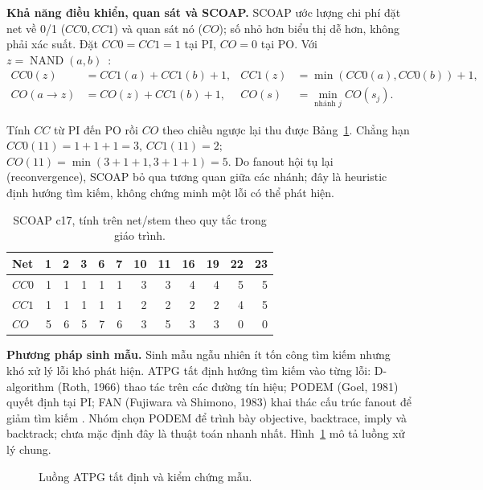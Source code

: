 \textbf{Khả năng điều khiển, quan sát và SCOAP.}
SCOAP ước lượng chi phí đặt net về 0/1 ($CC0,CC1$) và quan sát nó ($CO$);
số nhỏ hơn biểu thị dễ hơn, không phải xác suất. Đặt $CC0=CC1=1$ tại PI,
$CO=0$ tại PO. Với $z=\operatorname{NAND}(a,b)$~\cite[pp.~41--42]{p1_wang2006}:
\[
\begin{aligned}
CC0(z)&=CC1(a)+CC1(b)+1, & CC1(z)&=\min(CC0(a),CC0(b))+1,\\
CO(a\!\to\!z)&=CO(z)+CC1(b)+1, & CO(s)&=\min_{\text{nhánh }j}CO(s_j).
\end{aligned}
\]

Tính $CC$ từ PI đến PO rồi $CO$ theo chiều ngược lại thu được
Bảng~\ref{tab:p1-scoap}. Chẳng hạn $CC0(11)=1+1+1=3$,
$CC1(11)=2$; $CO(11)=\min(3+1+1,3+1+1)=5$.
Do fanout hội tụ lại (reconvergence), SCOAP bỏ qua tương quan giữa các nhánh;
đây là heuristic định hướng tìm kiếm, không chứng minh một lỗi có thể phát hiện.
\begin{table}[htbp]
\centering\small
\caption{SCOAP c17, tính trên net/stem theo quy tắc trong giáo trình.}
\label{tab:p1-scoap}
\begin{tabular}{@{}lrrrrrrrrrrr@{}}
\toprule
Net & 1 & 2 & 3 & 6 & 7 & 10 & 11 & 16 & 19 & 22 & 23\\
\midrule
$CC0$ & 1 & 1 & 1 & 1 & 1 & 3 & 3 & 4 & 4 & 5 & 5\\
$CC1$ & 1 & 1 & 1 & 1 & 1 & 2 & 2 & 2 & 2 & 4 & 5\\
$CO$  & 5 & 6 & 5 & 7 & 6 & 3 & 5 & 3 & 3 & 0 & 0\\
\bottomrule
\end{tabular}
\end{table}

\textbf{Phương pháp sinh mẫu.}
Sinh mẫu ngẫu nhiên ít tốn công tìm kiếm nhưng khó xử lý lỗi khó phát hiện.
ATPG tất định hướng tìm kiếm vào từng lỗi: D-algorithm (Roth, 1966) thao tác
trên các đường tín hiệu; PODEM (Goel, 1981) quyết định tại PI; FAN
(Fujiwara và Shimono, 1983) khai thác cấu trúc fanout để giảm tìm kiếm
\cite[Ch.~4]{p1_wang2006}. Nhóm chọn PODEM để trình bày objective, backtrace,
imply và backtrack; chưa mặc định đây là thuật toán nhanh nhất.
Hình~\ref{fig:p1-atpg-flow} mô tả luồng xử lý chung.
\begin{figure}[htbp]
\centering

\caption{Luồng ATPG tất định và kiểm chứng mẫu.}
\label{fig:p1-atpg-flow}
\end{figure}

